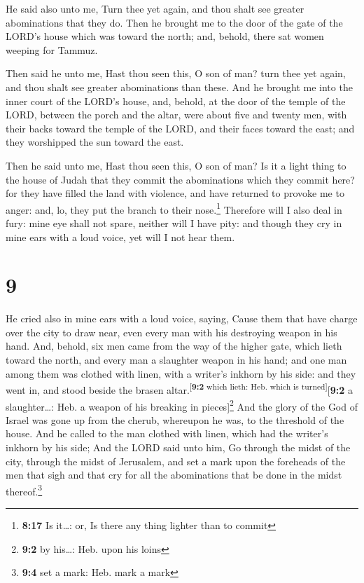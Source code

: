  He said also unto me, Turn thee yet again, and thou
shalt see greater abominations that they do.  Then he
brought me to the door of the gate of the LORD's house which was toward
the north; and, behold, there sat women weeping for Tammuz.

 Then said he unto me, Hast thou seen this, O son of man?
turn thee yet again, and thou shalt see greater abominations than these.
 And he brought me into the inner court of the LORD's
house, and, behold, at the door of the temple of the LORD, between the
porch and the altar, were about five and twenty men, with their backs
toward the temple of the LORD, and their faces toward the east; and they
worshipped the sun toward the east.

 Then he said unto me, Hast thou seen this, O son of man?
Is it a light thing to the house of Judah that they commit the
abominations which they commit here? for they have filled the land with
violence, and have returned to provoke me to anger: and, lo, they put
the branch to their nose.\footnote{\textbf{8:17} Is it\ldots: or, Is
  there any thing lighter than to commit}  Therefore will
I also deal in fury: mine eye shall not spare, neither will I have pity:
and though they cry in mine ears with a loud voice, yet will I not hear
them.

\hypertarget{section-8}{%
\section{9}\label{section-8}}

 He cried also in mine ears with a loud voice, saying,
Cause them that have charge over the city to draw near, even every man
with his destroying weapon in his hand.  And, behold, six
men came from the way of the higher gate, which lieth toward the north,
and every man a slaughter weapon in his hand; and one man among them was
clothed with linen, with a writer's inkhorn by his side: and they went
in, and stood beside the brasen altar.\textsuperscript{{[}\textbf{9:2}
which lieth: Heb. which is turned{]}}{[}\textbf{9:2} a slaughter\ldots:
Heb. a weapon of his breaking in pieces{]}\footnote{\textbf{9:2} by
  his\ldots: Heb. upon his loins}  And the glory of the
God of Israel was gone up from the cherub, whereupon he was, to the
threshold of the house. And he called to the man clothed with linen,
which had the writer's inkhorn by his side;  And the LORD
said unto him, Go through the midst of the city, through the midst of
Jerusalem, and set a mark upon the foreheads of the men that sigh and
that cry for all the abominations that be done in the midst
thereof.\footnote{\textbf{9:4} set a mark: Heb. mark a mark}

